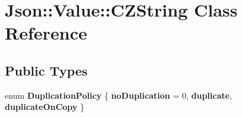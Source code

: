 \hypertarget{class_json_1_1_value_1_1_c_z_string}{\section{Json\-:\-:Value\-:\-:C\-Z\-String Class Reference}
\label{class_json_1_1_value_1_1_c_z_string}
}
\subsection*{Public Types}
\begin{DoxyCompactItemize}
\item 
enum {\bfseries Duplication\-Policy} \{ {\bfseries no\-Duplication} = 0, 
{\bfseries duplicate}, 
{\bfseries duplicate\-On\-Copy}
 \}
\end{DoxyCompactItemize}
